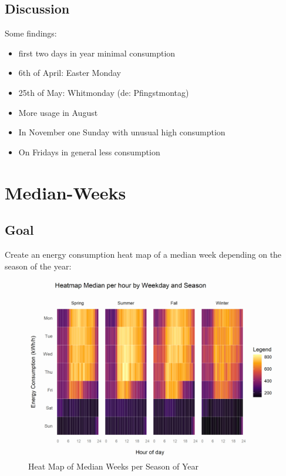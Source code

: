 \documentclass[
  a4paperpaper,
]{book}
\begin{document}
\hypertarget{discussion-5}{%
\subsection{Discussion}\label{discussion-5}}

Some findings:

\begin{itemize}
\item
  first two days in year minimal consumption
\item
  6th of April: Easter Monday
\item
  25th of May: Whitmonday (de: Pfingstmontag)
\item
  More usage in August
\item
  In November one Sunday with unusual high consumption
\item
  On Fridays in general less consumption
\end{itemize}

\newpage

\hypertarget{median-weeks}{%
\section{Median-Weeks}\label{median-weeks}}

\hypertarget{goal-11}{%
\subsection{Goal}\label{goal-11}}

Create an energy consumption heat map of a median week depending on the season of the year:

\begin{figure}
\includegraphics[width=0.7\linewidth]{images/plotHeatMapMedianWeeks} \caption{Heat Map of Median Weeks per Season of Year}\label{fig:unnamed-chunk-21}
\end{figure}
\end{document}

